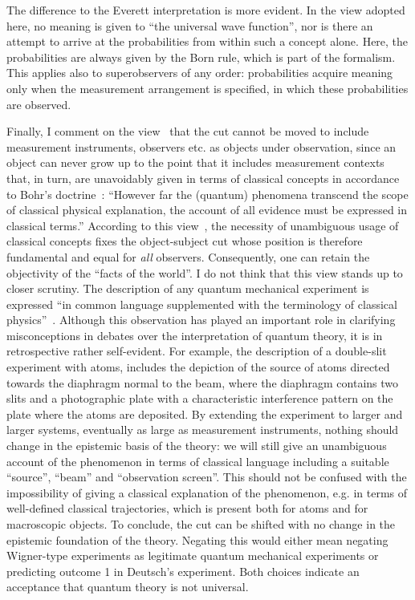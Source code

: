 \documentclass[12pt]{article}
\begin{document}
The difference to the Everett interpretation is more evident. In the view adopted here, no meaning is given to ``the universal wave function'', nor is there an attempt to arrive at the probabilities from within such a concept alone. Here, the probabilities are always given by the Born rule, which is part of the formalism. This applies also to superobservers of any order: probabilities acquire meaning only when the measurement arrangement is specified, in which these probabilities are observed. 

Finally, I comment on the view~\cite{grangier} that the cut cannot be moved to include measurement instruments, observers etc. as objects under observation, since an object can never grow up to the point that it includes measurement contexts that, in turn, are unavoidably given in terms of classical concepts in accordance to Bohr's doctrine~\cite{bohr1}: ``However far the (quantum) phenomena transcend the scope of classical physical explanation, the account of all evidence must be expressed in classical terms.'' According to this view~\cite{grangier}, the necessity of unambiguous usage of classical concepts fixes the object-subject cut whose position is therefore fundamental and equal for {\it all} observers. Consequently, one can retain the objectivity of the ``facts of the world''. I do not think that this view stands up to closer scrutiny. The description of any quantum mechanical experiment is expressed ``in common language supplemented with the terminology of classical physics''~\cite{bohr4}. Although this observation has played an important role in clarifying misconceptions in debates over the interpretation of quantum theory, it is in retrospective rather self-evident. For example, the description of a double-slit experiment with atoms, includes the depiction of the source of atoms directed towards the diaphragm normal to the beam, where the diaphragm contains two slits and a photographic plate with a characteristic interference pattern on the plate where the atoms are deposited. By extending the experiment to larger and larger systems, eventually as large as measurement instruments, nothing should change in the epistemic basis of the theory: we will still give an unambiguous account of the phenomenon in terms of classical language including a suitable ``source'', ``beam'' and ``observation screen''. This should not be confused with the impossibility of giving a classical explanation of the phenomenon, e.g. in terms of  well-defined classical trajectories, which is present both for atoms and for macroscopic objects. To conclude, the cut can be shifted with no change in the epistemic foundation of the theory. Negating this would either mean negating Wigner-type experiments as legitimate quantum mechanical experiments or predicting outcome 1 in Deutsch's experiment. Both choices indicate an acceptance that quantum theory is not universal. 
\end{document}
